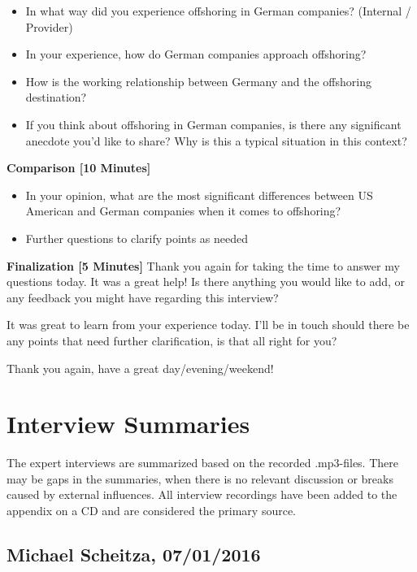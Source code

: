 \begin{appendix}
\begin{itemize}
	\item In what way did you experience offshoring in German companies? (Internal / Provider)
	\item In your experience, how do German companies approach offshoring?
	\item How is the working relationship between Germany and the offshoring destination?
	\item If you think about offshoring in German companies, is there any significant anecdote you’d like to share? Why is this a typical situation in this context?
\end{itemize}


{\bf Comparison [10 Minutes]}
\begin{itemize}
	\item In your opinion, what are the most significant differences between US American and German companies when it comes to offshoring?
	\item Further questions to clarify points as needed
\end{itemize}

{\bf Finalization [5 Minutes]}
Thank you again for taking the time to answer my questions today. It was a great help! Is there anything you would like to add, or any feedback you might have regarding this interview?

It was great to learn from your experience today. I’ll be in touch should there be any points that need further clarification, is that all right for you?

Thank you again, have a great day/evening/weekend!


\tocless\section{Interview Summaries}
The expert interviews are summarized based on the recorded .mp3-files. There may be gaps in the summaries, when there is no relevant discussion or breaks caused by external influences. All interview recordings have been added to the appendix on a CD and are considered the primary source.

\tocless\subsection{Michael Scheitza, 07/01/2016}
\label{int:Scheitza}


\end{appendix}
